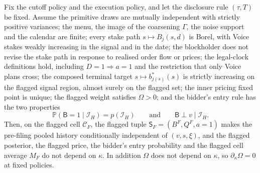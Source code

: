 
\providecommand{\Eop}{\mathbb{E}}
\providecommand{\Prb}{\mathbb{P}}
\providecommand{\ind}{\mathbf{1}}
\providecommand{\ND}{\mathrm{ND}}
\providecommand{\Sfl}{\mathsf{S}_F}

\begin{lemma}
\label{lem:flagged-kappa-free}
Fix the cutoff policy and the execution policy, and let the disclosure rule $(\tau,T)$ be fixed.
Assume the primitive draws are mutually independent with strictly positive variances; the menu, the
image of the coarsening $\Gamma$, the noise support and the calendar are finite; every stake path
$s\mapsto B_j(s,d)$ is Borel, with Voice stakes weakly increasing in the signal and in the date; the
blockholder does not revise the stake path in response to realised order flow or prices; the legal-clock definitions
hold, including $D=1\Rightarrow a=1$ and the restriction that only Voice plans cross; the composed
terminal target $s\mapsto b^*_{j(s)}(s)$ is strictly increasing on the flagged signal region, almost
surely on the flagged set; the inner pricing fixed point is unique; the flagged weight satisfies
$\Omega>0$; and the bidder's entry rule has the two properties
\begin{equation}
\label{eq:entry-props}
\Prb(\mathsf B=1\mid\mathcal I_H)=p(\mathcal I_H)
\qquad\text{and}\qquad
\mathsf B \perp v \mid \mathcal I_H .
\end{equation}
Then, on the flagged cell $\mathcal C_F$, the flagged tuple $\Sfl=(B^F,Q^F,a{=}1)$ makes the
pre-filing pooled history conditionally independent of $(v,s,\xi)$, and the flagged posterior, the
flagged price, the bidder's entry probability and the flagged cell average $M_F$ do not depend on
$\kappa$. In addition $\Omega$ does not depend on $\kappa$, so $\partial_\kappa\Omega=0$ at fixed
policies.
\end{lemma}

